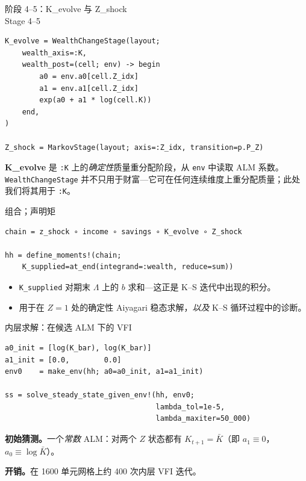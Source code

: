 \documentclass[10pt,aspectratio=169]{beamer}
\begin{document}
\begin{frame}[fragile]{阶段 4--5：K\_evolve 与 Z\_shock \\ Stage 4--5}
\begin{lstlisting}
K_evolve = WealthChangeStage(layout;
    wealth_axis=:K,
    wealth_post=(cell; env) -> begin
        a0 = env.a0[cell.Z_idx]
        a1 = env.a1[cell.Z_idx]
        exp(a0 + a1 * log(cell.K))
    end,
)

Z_shock = MarkovStage(layout; axis=:Z_idx, transition=p.P_Z)
\end{lstlisting}

\textbf{K\_evolve} 是 \texttt{:K} 上的\emph{确定性}质量重分配阶段，从 \texttt{env} 中读取 ALM 系数。\texttt{WealthChangeStage} 并不只用于财富---它可在任何连续维度上重分配质量；此处我们将其用于 \texttt{:K}。

\end{frame}

\begin{frame}[fragile]{组合；声明矩}
\begin{lstlisting}
chain = z_shock ∘ income ∘ savings ∘ K_evolve ∘ Z_shock

hh = define_moments!(chain;
    K_supplied=at_end(integrand=:wealth, reduce=sum))
\end{lstlisting}

\vspace{0.4em}

\begin{itemize}
  \item \texttt{K\_supplied} 对期末 $\Lambda$ 上的 $b$ 求和---这正是 K--S 迭代中出现的积分。
  \item 用于在 $Z = 1$ 处的确定性 Aiyagari 稳态求解，\emph{以及} K--S 循环过程中的诊断。
\end{itemize}

\end{frame}

\begin{frame}[fragile]{内层求解：在候选 ALM 下的 VFI}
\begin{lstlisting}
a0_init = [log(K_bar), log(K_bar)]
a1_init = [0.0,        0.0]
env0    = make_env(hh; a0=a0_init, a1=a1_init)

ss = solve_steady_state_given_env!(hh, env0;
                                   lambda_tol=1e-5,
                                   lambda_maxiter=50_000)
\end{lstlisting}

\textbf{初始猜测。}一个\emph{常数} ALM：对两个 $Z$ 状态都有 $K_{t+1} = \bar K$（即 $a_1 \equiv 0$，$a_0 \equiv \log \bar K$）。

\textbf{开销。}在 1600 单元网格上约 400 次内层 VFI 迭代。
\end{frame}
\end{document}
